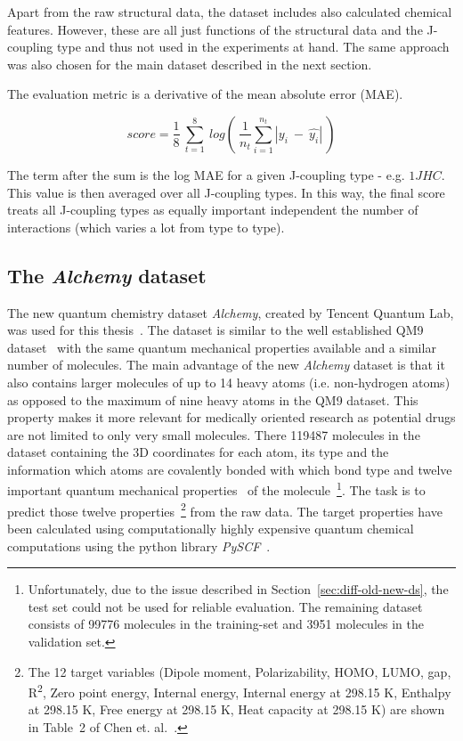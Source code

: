 Apart from the raw structural data, the dataset includes also calculated chemical features. However, these are all just functions of the structural data and the J-coupling type and thus not used in the experiments at hand. The same approach was also chosen for the main dataset described in the next section.

The evaluation metric is a derivative of the mean absolute error (MAE).

\begin{equation}
	score = \frac{1}{8} ~ \sum_{t=1}^{8} ~ log(~\frac{1}{n_t} \sum_{i=1}^{n_t}|y_i~-~\hat{y_i}| ~)
\end{equation}

The term after the sum is the log MAE for a given J-coupling type - e.g. $1JHC$. This value is then averaged over all J-coupling types. In this way, the final score treats all J-coupling types as equally important independent the number of interactions (which varies a lot from type to type).

\subsection{The \textit{Alchemy} dataset}
\label{sec:alchemy-dataset}
The new quantum chemistry dataset \textit{Alchemy}, created by Tencent Quantum Lab, was used for this thesis~\cite{Chen2019}. The dataset is similar to the well established QM9 dataset~\cite{Ramakrishnan2014} with the same quantum mechanical properties available and a similar number of molecules. The main advantage of the new \textit{Alchemy} dataset is that it also contains larger molecules of up to 14 heavy atoms (i.e. non-hydrogen atoms) as opposed to the maximum of nine heavy atoms in the QM9 dataset. This property makes it more relevant for medically oriented research as potential drugs are not limited to only very small molecules. 
There 119487 molecules in the dataset containing the 3D coordinates for each atom, its type and the information which atoms are covalently bonded with which bond type and twelve important quantum mechanical properties~\cite{Chen2019} of the molecule~\footnote{
	Unfortunately, due to the issue described in Section~\ref{sec:diff-old-new-ds}, the test set could not be used for reliable evaluation. The remaining dataset consists of 99776 molecules in the training-set and 3951 molecules in the validation set.
}. The task is to predict those twelve properties~\footnote{
	The 12 target variables
	(Dipole moment, Polarizability, HOMO, LUMO, gap, R\textsuperscript2, Zero point energy, Internal energy, Internal energy at 298.15 K, Enthalpy at 298.15 K, Free energy at 298.15 K, Heat capacity at 298.15 K) are shown in Table~2 of Chen et. al.~\cite{Chen2019}.
} from the raw data. The target properties have been calculated using computationally highly expensive quantum chemical computations using the python library \textit{PySCF}~\cite{Sun2017}.



